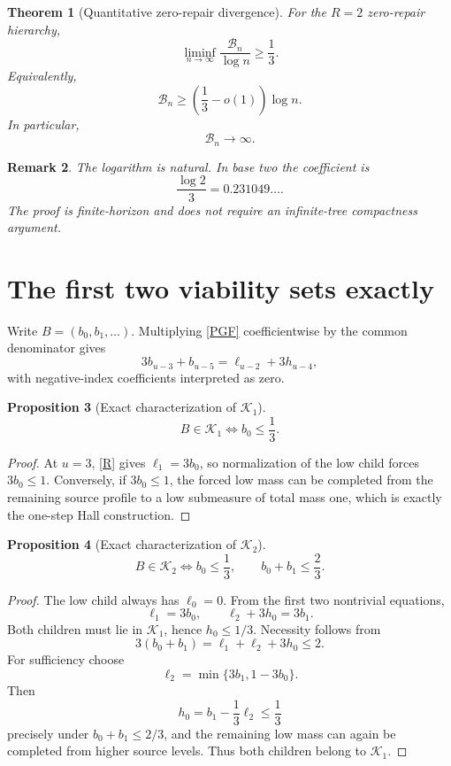 \documentclass[11pt,a4paper]{article}
\newtheorem{theorem}{Theorem}[section]
\newtheorem{proposition}[theorem]{Proposition}
\newtheorem{remark}[theorem]{Remark}
\newcommand{\cB}{\mathcal B}
\newcommand{\cK}{\mathcal K}
\newcommand{\1}{\mathbf 1}
\begin{document}
\begin{theorem}[Quantitative zero-repair divergence]
For the \(R=2\) zero-repair hierarchy,
\[
\boxed{
\liminf_{n\to\infty}
\frac{\cB_n}{\log n}
\ge
\frac13.
}
\]
Equivalently,
\[
\cB_n
\ge
\left(\frac13-o(1)\right)\log n.
\]
In particular,
\[
\boxed{\cB_n\to\infty.}
\]
\end{theorem}

\begin{remark}
The logarithm is natural.  In base two the coefficient is
\[
\frac{\log2}{3}=0.231049\ldots.
\]
The proof is finite-horizon and does not require an infinite-tree compactness
argument.
\end{remark}

\section{The first two viability sets exactly}

Write \(B=(b_0,b_1,\ldots)\).
Multiplying \eqref{PGF} coefficientwise by the common denominator gives
\[
3b_{u-3}+b_{u-5}
=
\ell_{u-2}+3h_{u-4},
\tag{R}
\]
with negative-index coefficients interpreted as zero.

\begin{proposition}[Exact characterization of \(\cK_1\)]
\[
\boxed{
B\in\cK_1
\iff
b_0\le\frac13.
}
\]
\end{proposition}

\begin{proof}
At \(u=3\), \eqref{R} gives \(\ell_1=3b_0\), so normalization of the low child
forces \(3b_0\le1\).  Conversely, if \(3b_0\le1\), the forced low mass can be
completed from the remaining source profile to a low submeasure of total mass
one, which is exactly the one-step Hall construction.
\end{proof}

\begin{proposition}[Exact characterization of \(\cK_2\)]
\[
\boxed{
B\in\cK_2
\iff
b_0\le\frac13,
\qquad
b_0+b_1\le\frac23.
}
\]
\end{proposition}

\begin{proof}
The low child always has \(\ell_0=0\).  From the first two nontrivial equations,
\[
\ell_1=3b_0,
\qquad
\ell_2+3h_0=3b_1.
\]
Both children must lie in \(\cK_1\), hence \(h_0\le1/3\).  Necessity follows
from
\[
3(b_0+b_1)=\ell_1+\ell_2+3h_0\le2.
\]
For sufficiency choose
\[
\ell_2=\min\{3b_1,1-3b_0\}.
\]
Then
\[
h_0=b_1-\frac13\ell_2\le\frac13
\]
precisely under \(b_0+b_1\le2/3\), and the remaining low mass can again be
completed from higher source levels.  Thus both children belong to \(\cK_1\).
\end{proof}
\end{document}
